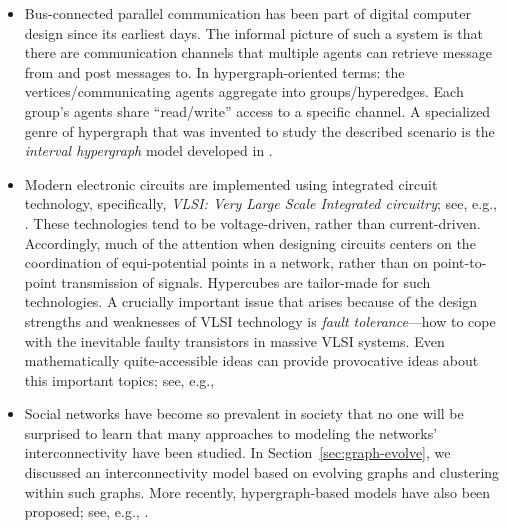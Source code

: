 \begin{itemize}
\item
Bus-connected parallel communication has been part of digital computer
 design since
its earliest days.  The informal picture of such a system is that
there are communication channels that multiple agents can retrieve
message from and post messages to.  In hypergraph-oriented terms: the
vertices/communicating agents aggregate into groups/hyperedges.  Each
group's agents share ``read/write'' access to a specific channel.  A
specialized genre of hypergraph that was invented to study the
described scenario is the {\it interval hypergraph}
 model developed in
\cite{Rosenberg89a}.

\item
Modern electronic circuits are implemented using integrated circuit
 technology,
specifically, {\em VLSI: Very Large Scale Integrated circuitry}; see,
e.g., \cite{Mead-Conway}.  These technologies tend to be
voltage-driven, rather than current-driven.  Accordingly, much of the
attention when designing circuits centers on the coordination of
equi-potential points in a network, rather than on point-to-point
transmission of signals.  Hypercubes are tailor-made for such
technologies.  A crucially important issue that arises because of the
design strengths and weaknesses of  VLSI technology is {\it fault
  tolerance}---how to cope with the inevitable faulty transistors in
massive VLSI systems.  Even mathematically quite-accessible ideas can
provide provocative ideas about this important topics; see, e.g.,
\cite{Rosenberg85a}

\item
Social networks have become so prevalent in society that no one will
be surprised to learn that many approaches to modeling the networks'
interconnectivity have been studied.  In
Section~\ref{sec:graph-evolve}, we discussed an interconnectivity
model based on evolving graphs and clustering within such graphs.
More recently, hypergraph-based models
have also been proposed; see, e.g., \cite{Amatoetal17,LiuBV10}.
\end{itemize}





